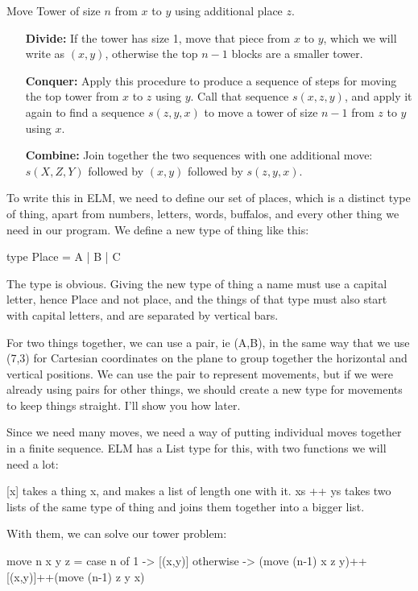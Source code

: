 \documentclass[12pt]{amsbook}
\begin{document}
Move Tower of size $n$ from $x$ to $y$ using additional place $z$.
\begin{itemize}
\item[\textbf{Divide:}]  If the tower has size 1, move that piece from $x$ to $y$, which we will write as $(x,y)$, otherwise the top $n-1$ blocks are a smaller tower.
\item[\textbf{Conquer:}]  Apply this procedure to produce a sequence of steps for moving the top tower from $x$ to $z$ using $y$.  Call that sequence $s(x,z,y)$, and apply it again to find a sequence $s(z,y,x)$ to move a tower of size $n-1$ from $z$ to $y$ using $x$.
\item[\textbf{Combine:}]  Join together the two sequences with one additional move:  $s(X,Z,Y)$ followed by $(x,y)$ followed by $s(z,y,x)$.
\end{itemize}
To write this in ELM, we need to define our set of places, which is a distinct type of thing, apart from numbers, letters, words, buffalos, and every other thing we need in our program.  We define a new type of thing like this:

\begin{code}
type Place = A | B | C
\end{code}

The type is obvious.  Giving the new type of thing a name must use a capital letter, hence Place and not place, and the things of that type must also start with capital letters, and are separated by vertical bars.

For two things together, we can use a pair, ie (A,B), in the same way that we use (7,3) for Cartesian coordinates on the plane to group together the horizontal and vertical positions. We can use the pair to represent movements, but if we were already using pairs for other things, we should create a new type for movements to keep things straight.  I'll show you how later.

Since we need many moves, we need a way of putting individual moves together in a finite sequence.  ELM has a List type for this, with two functions we will need a lot:

[x] takes a thing x, and makes a list of length one with it.
xs ++ ys  takes two lists of the same type of thing and joins them together into a bigger list.

With them, we can solve our tower problem:

\begin{code}
move n x y z = case n of
                 1 ->         [(x,y)]
                 otherwise -> (move (n-1) x z y)++[(x,y)]++(move (n-1) z y x) 
\end{code}
\end{document}
